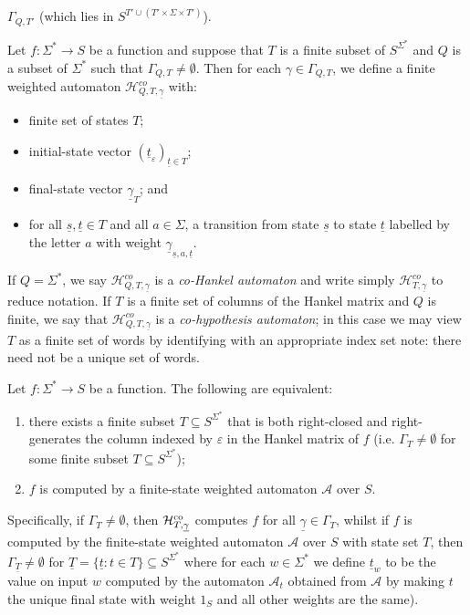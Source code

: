 \documentclass{lmcs}
\numberwithin{theorem}{section}
\begin{document}
$\Gamma_{Q, T'}$ (which lies in $S^{T' \cup (T'\times \Sigma \times T')}$).
\begin{defi}
\label{definition:cohankel}
Let $f: \Sigma^* \rightarrow S$ be a function and suppose that $T$ is a finite subset of $S^{\Sigma^*}$ and $Q$ is a subset of $\Sigma^*$ such that $\Gamma_{Q, T} \neq \emptyset$. Then for each $\gamma \in \Gamma_{Q, T}$, we define a finite weighted automaton $\mathcal{H}^{co}_{Q, T, \underline{\gamma}}$ with:
\begin{itemize}
\item finite set of states $T$;
\item initial-state vector $(\underline{t}_\varepsilon)_{\underline{t} \in T}$;
\item final-state vector $\underline{\gamma}_{T}$; and
\item for all $\underline{s}, \underline{t} \in T$ and all $a \in \Sigma$, a transition from state $\underline{s}$ to state $\underline{t}$ labelled by the letter $a$ with weight $\underline{\gamma}_{\underline{s},a,\underline{t}}$.
\end{itemize}\noindent %
If $Q = \Sigma^*$,  we say $\mathcal{H}^{co}_{Q, T, \underline{\gamma}}$ is a \emph{co-Hankel automaton} and write simply $\mathcal{H}^{co}_{T, \underline{\gamma}}$ to reduce notation. If $T$ is a finite set of columns of the Hankel matrix and $Q$ is finite, we say that $\mathcal{H}^{co}_{Q, T, \underline{\gamma}}$ is a \emph{co-hypothesis automaton}; in this case we may view $T$ as a finite set of words by identifying with an appropriate index set note: there need not be a unique set of words.\end{defi} 

\begin{thm} 
\label{theorem:comain}
Let $f: \Sigma^* \rightarrow S$ be a function. The following are equivalent:
\begin{enumerate}
\item there exists a finite subset $T \subseteq S^{\Sigma^*}$ that is both right-closed and right-generates the column indexed by $\varepsilon$ in the Hankel matrix of $f$ (i.e. $\Gamma_T \neq \emptyset$ for some finite subset $T\subseteq S^{\Sigma^*}$);
\item $f$ is computed by a finite-state weighted automaton $\mathcal{A}$ over $S$.   
\end{enumerate}
Specifically, if $\Gamma_T \neq \emptyset$, then $\mathcal{H}^{\rm co}_{T, \underline{\gamma}}$ computes $f$ for all $\underline{\gamma}\in \Gamma_T$, whilst if $f$ is computed by the finite-state weighted automaton $\mathcal{A}$ over $S$ with state set $T$, then $\Gamma_{\underline{T}} \neq \emptyset$ for $\underline{T} = \{\underline{t}: t \in T\} \subseteq S^{\Sigma^*}$ where for each $w \in \Sigma^*$ we define  $\underline{t}_w$ to be the value on input $w$ computed by the automaton $\mathcal{A}_t$ obtained from $\mathcal{A}$ by making $t$ the unique final state with weight $1_S$ and all other weights are the same).
\end{thm}
\end{document}
